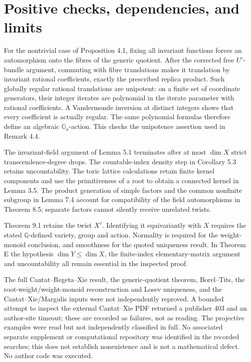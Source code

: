 \documentclass[10pt]{article}
\begin{document}
\section*{Positive checks, dependencies, and limits}
For the nontrivial case of Proposition 4.1, fixing all invariant functions forces an automorphism onto the fibres of the generic quotient. After the corrected free \(U'\)-bundle argument, commuting with fibre translations makes it translation by invariant rational coefficients, exactly the prescribed replica product. Such globally regular rational translations are unipotent: on a finite set of coordinate generators, their integer iterates are polynomial in the iterate parameter with rational coefficients. A Vandermonde inversion at distinct integers shows that every coefficient is actually regular. The same polynomial formulas therefore define an algebraic \(\mathbb G_a\)-action. This checks the unipotence assertion used in Remark 4.4.\par
The invariant-field argument of Lemma 5.1 terminates after at most \(\dim X\) strict transcendence-degree drops. The countable-index density step in Corollary 5.3 retains uncountability. The toric lattice calculations retain finite kernel components and use the primitiveness of a root to obtain a connected kernel in Lemma 3.5. The product generation of simple factors and the common nonfinite subgroup in Lemma 7.4 account for compatibility of the field automorphisms in Theorem 8.5; separate factors cannot silently receive unrelated twists.\par
Theorem 9.1 retains the twist \(X^\tau\). Identifying it equivariantly with \(X\) requires the stated \(\mathbb Q\)-defined variety, group and action. Normality is required for the weight-monoid conclusion, and smoothness for the quoted uniqueness result. In Theorem E the hypothesis \(\dim Y\le\dim X\), the finite-index elementary-matrix argument and uncountability all remain essential in the inspected proof.\par
The full Cantat–Regeta–Xie result, the generic-quotient theorem, Borel–Tits, the root-weight/weight-monoid reconstruction and Losev uniqueness, and the Cantat–Xie/Margulis inputs were not independently reproved. A bounded attempt to inspect the external Cantat–Xie PDF returned a publisher 403 and an author-site timeout; these are recorded as failures, not as reading. The projective examples were read but not independently classified in full. No associated separate supplement or computational repository was identified in the recorded searches; this does not establish nonexistence and is not a mathematical defect. No author code was executed.\par
\end{document}
